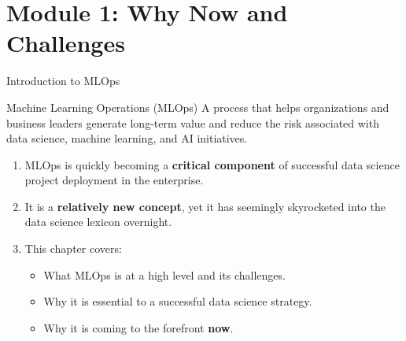 
\section{Module 1: Why Now and Challenges}

\begin{frame}{Introduction to MLOps}
\begin{block}{Machine Learning Operations (MLOps)}
A process that helps organizations and business leaders generate long-term value and reduce the risk associated with data science, machine learning, and AI initiatives.
\end{block}
\vspace{0.2cm}
\begin{enumerate}
\item<1-> MLOps is quickly becoming a \textbf{critical component} of successful data science project deployment in the enterprise.
\item<2-> It is a \textbf{relatively new concept}, yet it has seemingly skyrocketed into the data science lexicon overnight.
\item<3-> This chapter covers:
    \begin{itemize}
    \item What MLOps is at a high level and its challenges.
    \item Why it is essential to a successful data science strategy.
    \item Why it is coming to the forefront \textbf{now}.
    \end{itemize}
\end{enumerate}
\end{frame}


